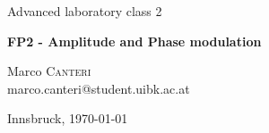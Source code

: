 \documentclass[a4paper,10pt]{article}
\begin{document}
\begin{titlepage}
 \begin{center}
	\Large{Advanced laboratory class 2}
	\end{center}
	\begin{center}
	 \LARGE{\textbf{FP2 - Amplitude and Phase modulation}}
	\end{center}
	
	\begin{center}
	
	\large Marco \textsc{Canteri} \\
	marco.canteri@student.uibk.ac.at
	\end{center}
	
	\begin{center}
	\vspace{1cm}
	Innsbruck, \today
	\vspace{2cm}
	\end{center}
	

\end{titlepage}
\end{document}
